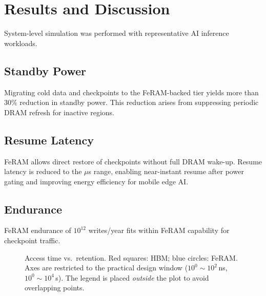 \section{Results and Discussion}
System-level simulation was performed with representative AI inference workloads.

\subsection{Standby Power}
Migrating cold data and checkpoints to the FeRAM-backed tier yields more than 30\% reduction in standby power.
This reduction arises from suppressing periodic DRAM refresh for inactive regions.

\subsection{Resume Latency}
FeRAM allows direct restore of checkpoints without full DRAM wake-up.
Resume latency is reduced to the $\mu$s range, enabling near-instant resume after power gating
and improving energy efficiency for mobile edge AI.

\subsection{Endurance}
FeRAM endurance of $10^{12}$ writes/year fits within FeRAM capability for checkpoint traffic.

\begin{figure}[t]
\centering
{}
\caption{Access time vs.\ retention. Red squares: HBM; blue circles: FeRAM.
Axes are restricted to the practical design window ($10^0\!\sim\!10^2$\,ns, $10^0\!\sim\!10^4$\,s).
The legend is placed \emph{outside} the plot to avoid overlapping points.}
\label{fig:retention_access}
\end{figure}
